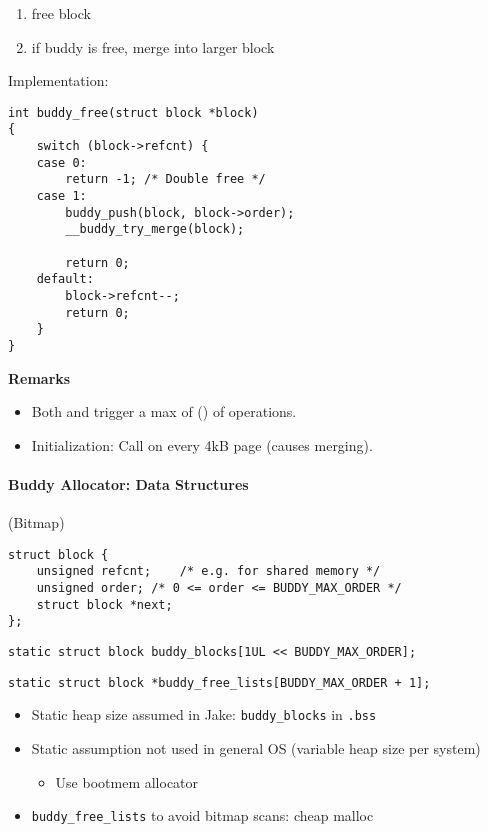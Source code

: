 \newpar{}
\begin{enumerate}
    \item free block
    \item if buddy is free, merge into larger block
\end{enumerate}

Implementation:
\begin{lstlisting}[style=bright_C++]
int buddy_free(struct block *block)
{
    switch (block->refcnt) {
    case 0:
        return -1; /* Double free */
    case 1:
        buddy_push(block, block->order);
        __buddy_try_merge(block);

        return 0;
    default:
        block->refcnt--;
        return 0;
    }
}
\end{lstlisting}

\textbf{Remarks}
\begin{itemize}
    \item Both  and  trigger a max of () of operations. %
    \item Initialization: Call  on every 4kB page (causes merging).
\end{itemize}

\paragraph{Buddy Allocator: Data Structures}
 (Bitmap)
\begin{lstlisting}[style=bright_C++]
struct block {
    unsigned refcnt;    /* e.g. for shared memory */
    unsigned order; /* 0 <= order <= BUDDY_MAX_ORDER */
    struct block *next;
};
\end{lstlisting}
\newpar{}
\begin{lstlisting}[style=bright_C++]
static struct block buddy_blocks[1UL << BUDDY_MAX_ORDER];
\end{lstlisting}

\begin{lstlisting}[style=bright_C++]
static struct block *buddy_free_lists[BUDDY_MAX_ORDER + 1];
\end{lstlisting}

\newpar{}
\begin{itemize}
    \item Static heap size assumed in Jake: \texttt{buddy\_blocks} in \texttt{.bss}
    \item Static assumption not used in general OS (variable heap size per system)
          \begin{itemize}
              \item Use bootmem allocator
          \end{itemize}
    \item \texttt{buddy\_free\_lists} to avoid bitmap scans: cheap malloc
\end{itemize}

